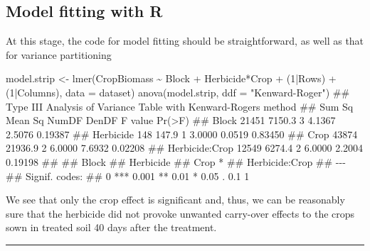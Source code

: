 \documentclass[a4paper,12pt,oneside]{book}
\newenvironment{Shaded}{\begin{snugshade}}{\end{snugshade}}
\newcommand{\DecValTok}[1]{#1}
\newcommand{\SpecialCharTok}[1]{#1}
\newcommand{\StringTok}[1]{#1}
\newcommand{\DocumentationTok}[1]{#1}
\newcommand{\OtherTok}[1]{#1}
\newcommand{\FunctionTok}[1]{#1}
\newcommand{\AttributeTok}[1]{#1}
\newcommand{\NormalTok}[1]{#1}
\begin{document}
\hypertarget{model-fitting-with-r-3}{%
\subsection{Model fitting with R}\label{model-fitting-with-r-3}}

At this stage, the code for model fitting should be straightforward, as well as that for variance partitioning

\begin{Shaded}
\begin{Highlighting}[]
\NormalTok{model.strip }\OtherTok{\textless{}{-}} \FunctionTok{lmer}\NormalTok{(CropBiomass }\SpecialCharTok{\textasciitilde{}}\NormalTok{ Block }\SpecialCharTok{+}\NormalTok{ Herbicide}\SpecialCharTok{*}\NormalTok{Crop }\SpecialCharTok{+} 
\NormalTok{    (}\DecValTok{1}\SpecialCharTok{|}\NormalTok{Rows) }\SpecialCharTok{+}\NormalTok{ (}\DecValTok{1}\SpecialCharTok{|}\NormalTok{Columns), }\AttributeTok{data =}\NormalTok{ dataset)}
\FunctionTok{anova}\NormalTok{(model.strip, }\AttributeTok{ddf =} \StringTok{"Kenward{-}Roger"}\NormalTok{)}
\DocumentationTok{\#\# Type III Analysis of Variance Table with Kenward{-}Roger\textquotesingle{}s method}
\DocumentationTok{\#\#                Sum Sq Mean Sq NumDF  DenDF F value  Pr(\textgreater{}F)}
\DocumentationTok{\#\# Block           21451  7150.3     3 4.1367  2.5076 0.19387}
\DocumentationTok{\#\# Herbicide         148   147.9     1 3.0000  0.0519 0.83450}
\DocumentationTok{\#\# Crop            43874 21936.9     2 6.0000  7.6932 0.02208}
\DocumentationTok{\#\# Herbicide:Crop  12549  6274.4     2 6.0000  2.2004 0.19198}
\DocumentationTok{\#\#                 }
\DocumentationTok{\#\# Block           }
\DocumentationTok{\#\# Herbicide       }
\DocumentationTok{\#\# Crop           *}
\DocumentationTok{\#\# Herbicide:Crop  }
\DocumentationTok{\#\# {-}{-}{-}}
\DocumentationTok{\#\# Signif. codes:  }
\DocumentationTok{\#\# 0 \textquotesingle{}***\textquotesingle{} 0.001 \textquotesingle{}**\textquotesingle{} 0.01 \textquotesingle{}*\textquotesingle{} 0.05 \textquotesingle{}.\textquotesingle{} 0.1 \textquotesingle{} \textquotesingle{} 1}
\end{Highlighting}
\end{Shaded}

We see that only the crop effect is significant and, thus, we can be reasonably sure that the herbicide did not provoke unwanted carry-over effects to the crops sown in treated soil 40 days after the treatment.

\begin{center}\rule{0.5\linewidth}{0.5pt}\end{center}
\end{document}
